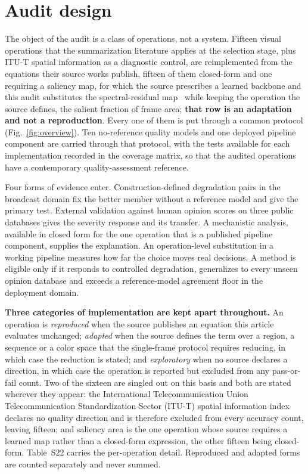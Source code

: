 \section{Audit design}\label{sec:method}

The object of the audit is a class of operations, not a system. Fifteen visual operations that the summarization literature applies at the selection stage,
plus ITU-T spatial information as a diagnostic control, are reimplemented from the
equations their source works publish, fifteen of them closed-form and one requiring
a saliency map, for which the source prescribes a learned backbone and this audit
substitutes the spectral-residual map~\citep{hou2007spectral} while keeping the operation
the source defines, the salient fraction of frame area; \textbf{that row is an adaptation
and not a reproduction}. Every one of them is put through a common protocol
(Fig.~\ref{fig:overview}). Ten no-reference quality models and one deployed pipeline
component are carried through that protocol, with the tests available for each
implementation recorded in the coverage matrix, so that the audited operations have a contemporary quality-assessment reference.

Four forms of evidence enter. Construction-defined degradation pairs in the broadcast
domain fix the better member without a reference model and give the primary test.
External validation against human opinion scores on three public databases gives the
severity response and its transfer. A mechanistic analysis, available in closed form for
the one operation that is a published pipeline component, supplies the explanation. An
operation-level substitution in a working pipeline measures how far the choice moves real
decisions. A method is eligible only if it responds to controlled degradation, generalizes
to every unseen opinion database and exceeds a reference-model agreement floor in the
deployment domain.

\textbf{Three categories of implementation are kept apart throughout.} An operation is
\emph{reproduced} when the source publishes an equation this article evaluates unchanged;
\emph{adapted} when the source defines the term over a region, a sequence or a color space
that the single-frame protocol requires reducing, in which case the reduction is stated;
and \emph{exploratory} when no source declares a direction, in which case the operation is
reported but excluded from any pass-or-fail count. Two of the sixteen are singled out on
this basis and both are stated wherever they appear: the International Telecommunication Union Telecommunication Standardization Sector
(ITU-T) spatial information index
declares no quality direction and is therefore excluded from every accuracy count, leaving
fifteen; and saliency area is the one operation whose source requires a learned map rather
than a closed-form expression, the other fifteen being closed-form. Table~S22
carries the per-operation detail. Reproduced and adapted forms are counted separately and never summed.

